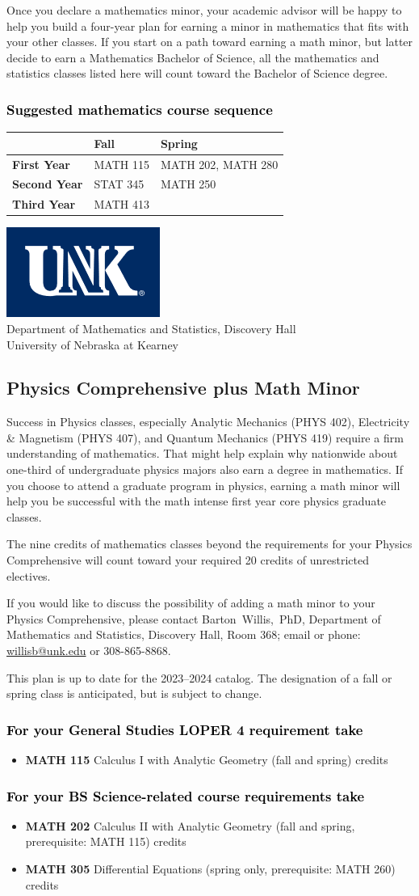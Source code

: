 \documentclass[10pt]{article}
\makeatletter
\newcommand{\calcone}{\textbf{MATH 115} Calculus I with Analytic Geometry (fall and spring) \dotfill 5 credits}
\newcommand{\calconeshort}{MATH 115}
\newcommand{\calctwo}{\textbf{MATH 202} Calculus II with Analytic Geometry (fall and spring, prerequisite: MATH 115) \dotfill 5 credits }
\newcommand{\calctwoshort}{MATH 202}
\newcommand{\foundationsshort}{MATH 250}
\newcommand{\linearshort}{MATH 280}
\newcommand{\discreteshort}{MATH 413}
\newcommand{\diffeq}{\textbf{MATH 305}	Differential Equations (spring only, prerequisite: MATH 260) \dotfill 	3 credits}
\newcommand{\appliedstatshort}{STAT 345}
\newcommand{\contactbw}{\mbox{Barton Willis, PhD}, Department of Mathematics and Statistics,  Discovery Hall, Room 368;
email or phone: \href{mailto:willisb@unk.edu}{willisb@unk.edu} or 308-865-8868.}
\newcommand{\forinfo}[2]{If you would like to discuss the possibility of adding a math {#1} to your {#2}, please contact \contactbw}
\newcommand{\catalog}{2023--2024 }
\newcommand{\LOPER}{LOPER\xspace}
\newcommand{\uptodate}{This plan is up to date for  the \catalog catalog. The designation of a fall or spring class is 
anticipated, but  is subject to change.}
\newcommand{\myheading}{
\begin{flushleft}
\includegraphics[scale=0.35]{unk-logo}\\
\setcounter{footnote}{0}
\vspace{0.25in}
 \textcolor{unkblue}{Department of Mathematics and Statistics, Discovery Hall} \\
  \textcolor{unkblue}{University of Nebraska at Kearney}
\end{flushleft}}
\newcommand{\mathminor}{
  \begin{center}
   \begin{tabular}[h]{| l | l | l|} 
      \hline
      & \textbf{Fall}         &  \textbf{Spring}  \\ \hline 
      \textbf{First Year} & \calconeshort & \calctwoshort, \linearshort \\  \hline
      \textbf{Second Year} &  \appliedstatshort{} &  \foundationsshort \\ \hline
      \textbf{Third Year} &    \discreteshort              &  \\ \hline
      \end{tabular}
      \end{center}}
\makeatother
\begin{document}
Once you declare a mathematics minor, your academic advisor 
will be happy to help you build a four-year plan for earning a minor 
in mathematics that fits with your other classes.  If you start on 
a path toward earning a math minor, but latter decide to earn a  
Mathematics Bachelor of Science, all the mathematics and statistics  
classes listed here will count toward the Bachelor of Science degree.

\subsubsection*{\textcolor{black}{Suggested mathematics course sequence}}

\mathminor




\newpage

\myheading


\subsection*{\textbf{\textcolor{unkblue}{Physics Comprehensive plus Math Minor}}}

\noindent Success in Physics classes, especially  Analytic Mechanics (PHYS 402), Electricity \& Magnetism (PHYS 407), and Quantum Mechanics (PHYS 419) require a 
firm understanding of mathematics. That might help explain why 
nationwide about one-third of undergraduate physics majors also 
earn a degree in mathematics. If you choose to attend a graduate 
program in physics, earning a math minor will help you be successful 
with the math intense first year core physics graduate classes.

The nine credits of mathematics classes beyond the requirements for 
your Physics Comprehensive will count toward your required 
20 credits of unrestricted electives.


\forinfo{minor}{Physics Comprehensive}

\uptodate

\subsubsection*{\textcolor{black}{For your General Studies \LOPER 4 requirement take}}
\begin{itemize}
\item \calcone
\end{itemize}

\subsubsection*{\textcolor{black}{For your BS Science-related course requirements take}}
\begin{itemize}
\item \calctwo
\item \diffeq
\end{itemize}
\end{document}
